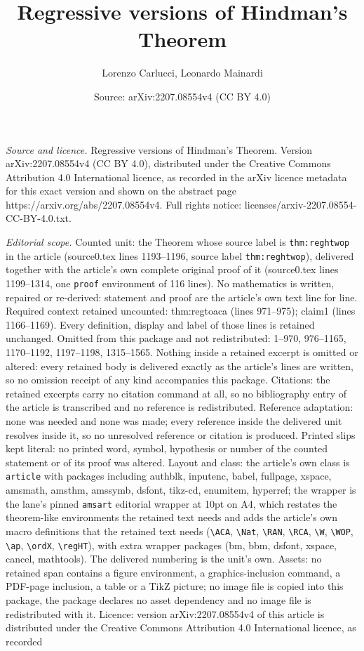 \documentclass[10pt,a4paper]{amsart}
\title[Regressive versions of Hindman's Theorem]{Regressive versions of Hindman's Theorem}
\author{Lorenzo Carlucci, Leonardo Mainardi}
\date{Source: arXiv:2207.08554v4 (CC BY 4.0)}
\begin{document}
\maketitle

\noindent\emph{Source and licence.} Regressive versions of Hindman's Theorem. Version arXiv:2207.08554v4 (CC BY 4.0), distributed under the Creative Commons Attribution 4.0 International licence, as recorded in the arXiv licence metadata for this exact version and shown on the abstract page https://arxiv.org/abs/2207.08554v4. Full rights notice: licenses/arxiv-2207.08554-CC-BY-4.0.txt.\par\smallskip

\noindent\textit{Editorial scope.} Counted unit: the Theorem whose source label is \texttt{thm:reghtwop} in the article (source0.tex lines 1193--1196, source label \texttt{thm:reghtwop}), delivered together with the article's own complete original proof of it (source0.tex lines 1199--1314, one \texttt{proof} environment of 116 lines). No mathematics is written, repaired or re-derived: statement and proof are the article's own text line for line. Required context retained uncounted: thm:regtoaca (lines 971--975); claim1 (lines 1166--1169). Every definition, display and label of those lines is retained unchanged. Omitted from this package and not redistributed: 1--970, 976--1165, 1170--1192, 1197--1198, 1315--1565. Nothing inside a retained excerpt is omitted or altered: every retained body is delivered exactly as the article's lines are written, so no omission receipt of any kind accompanies this package. Citations: the retained excerpts carry no citation command at all, so no bibliography entry of the article is transcribed and no reference is redistributed. Reference adaptation: none was needed and none was made; every reference inside the delivered unit resolves inside it, so no unresolved reference or citation is produced. Printed slips kept literal: no printed word, symbol, hypothesis or number of the counted statement or of its proof was altered. Layout and class: the article's own class is \texttt{article} with packages including authblk, inputenc, babel, fullpage, xspace, amsmath, amsthm, amssymb, dsfont, tikz-cd, enumitem, hyperref; the wrapper is the lane's pinned \texttt{amsart} editorial wrapper at 10pt on A4, which restates the theorem-like environments the retained text needs and adds the article's own macro definitions that the retained text needs (\texttt{\textbackslash ACA}, \texttt{\textbackslash Nat}, \texttt{\textbackslash RAN}, \texttt{\textbackslash RCA}, \texttt{\textbackslash W}, \texttt{\textbackslash WOP}, \texttt{\textbackslash ap}, \texttt{\textbackslash ordX}, \texttt{\textbackslash regHT}), with extra wrapper packages (bm, bbm, dsfont, xspace, cancel, mathtools). The delivered numbering is the unit's own. Assets: no retained span contains a figure environment, a graphics-inclusion command, a PDF-page inclusion, a table or a TikZ picture; no image file is copied into this package, the package declares no asset dependency and no image file is redistributed with it. Licence: version arXiv:2207.08554v4 of this article is distributed under the Creative Commons Attribution 4.0 International licence, as recorded 
\end{document}
